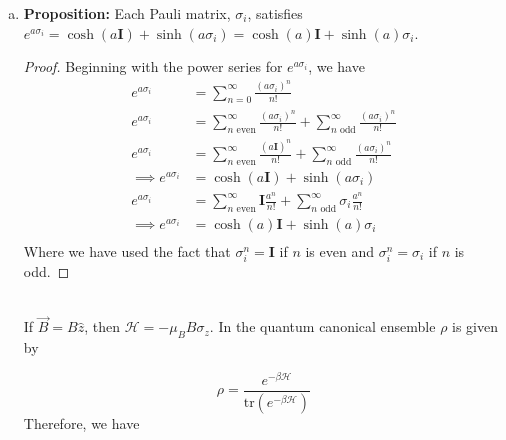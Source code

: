 \documentclass[]{article}
\begin{document}
\begin{enumerate}[1)]
\begin{enumerate}[a)]
\item  {\bf Proposition:} Each Pauli matrix, $\sigma_i$, satisfies $e^{a\sigma_i} = \cosh(a\textbf{I}) + \sinh(a\sigma_i) = \cosh(a)\textbf{I} + \sinh(a)\sigma_i $. 
\begin{proof}
Beginning with the power series for $e^{a\sigma_i}$, we have
\begin{equation}
\begin{split}
e^{a\sigma_i} & = \sum_{n=0}^{\infty} \frac{(a\sigma_i)^n}{n!} \\
e^{a\sigma_i} & = \sum_{n \text{ even}}^{\infty} \frac{(a\sigma_i)^n}{n!} + \sum_{n \text{ odd}}^{\infty} \frac{(a\sigma_i)^n}{n!}  \\ 
e^{a\sigma_i} & = \sum_{n \text{ even}}^{\infty} \frac{(a\textbf{I})^n}{n!} + \sum_{n \text{ odd}}^{\infty} \frac{(a\sigma_i)^n}{n!}  \\ 
\implies e^{a\sigma_i} & = \cosh(a\textbf{I}) + \sinh(a\sigma_i) \\
e^{a\sigma_i} & = \sum_{n \text{ even}}^{\infty} \textbf{I}\frac{a^n}{n!} + \sum_{n \text{ odd}}^{\infty} \sigma_i\frac{a^n}{n!}  \\ 
\implies e^{a\sigma_i} & = \cosh(a)\textbf{I} + \sinh(a)\sigma_i \\
\end{split}
\end{equation}
Where we have used the fact that $\sigma_i^n = \textbf{I}$ if $n$ is even and $\sigma_i^n=\sigma_i$ if $n$ is odd.
\end{proof} 
\hfill \\
If $\vec{B}=B\hat{z}$, then $\mathcal{H}=-\mu_BB\sigma_z$. In the quantum canonical ensemble $\rho$ is given by

\begin{equation}
\rho = \frac{   e^{-\beta\mathcal{H}}   }{\text{tr}\left(  e^{-\beta\mathcal{H}}   \right)}
\end{equation}
Therefore, we have 


\end{enumerate}
\end{enumerate}
\end{document}
